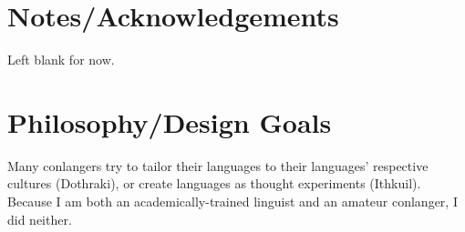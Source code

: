 \section*{Notes/Acknowledgements}

Left blank for now.


\section*{Philosophy/Design Goals}

Many conlangers try to tailor their languages to their languages' respective cultures (Dothraki), or create languages as thought experiments (Ithkuil). Because I am both an academically-trained linguist and an amateur conlanger, I did neither.



